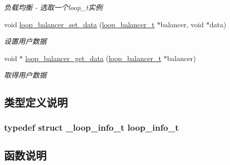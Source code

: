 \begin{DoxyCompactItemize}
\begin{DoxyCompactList}\small\item\em 负载均衡 -\/ 选取一个loop\+\_\+t实例 \end{DoxyCompactList}\item 
void \hyperlink{a00105_gae10d6df162c0c43fbfb2bb68cca09e8b_gae10d6df162c0c43fbfb2bb68cca09e8b}{loop\+\_\+balancer\+\_\+set\+\_\+data} (\hyperlink{a00050_a649c7e850ab247b5f70ad27e335a129d_a649c7e850ab247b5f70ad27e335a129d}{loop\+\_\+balancer\+\_\+t} $\ast$balancer, void $\ast$data)
\begin{DoxyCompactList}\small\item\em 设置用户数据 \end{DoxyCompactList}\item 
void $\ast$ \hyperlink{a00105_ga0f686f513ccb9026c58ab4675e5f87e2_ga0f686f513ccb9026c58ab4675e5f87e2}{loop\+\_\+balancer\+\_\+get\+\_\+data} (\hyperlink{a00050_a649c7e850ab247b5f70ad27e335a129d_a649c7e850ab247b5f70ad27e335a129d}{loop\+\_\+balancer\+\_\+t} $\ast$balancer)
\begin{DoxyCompactList}\small\item\em 取得用户数据 \end{DoxyCompactList}\end{DoxyCompactItemize}


\subsection{类型定义说明}
\hypertarget{a00071_a4ae76cfed863999ec747314b93b9287d_a4ae76cfed863999ec747314b93b9287d}{}
\subsubsection[{loop\+\_\+info\+\_\+t}]{\setlength{\rightskip}{0pt plus 5cm}typedef struct {\bf \+\_\+loop\+\_\+info\+\_\+t}  {\bf loop\+\_\+info\+\_\+t}}\label{a00071_a4ae76cfed863999ec747314b93b9287d_a4ae76cfed863999ec747314b93b9287d}


\subsection{函数说明}
\hypertarget{a00105_ga2b3cf2cb63d914efe226e901a50d8b0a_ga2b3cf2cb63d914efe226e901a50d8b0a}{}

